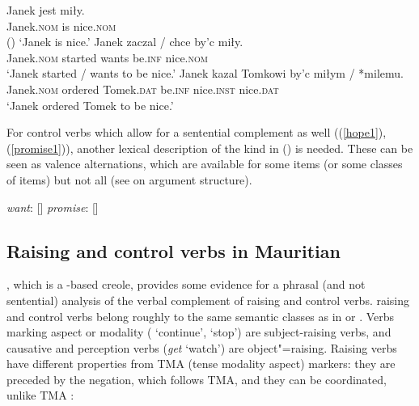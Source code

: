 \begin{exe}
\ex \begin{xlist}
\ex 
\gll Janek jest miły.\\
     Janek.\textsc{nom} is nice.\textsc{nom} \\ \hfill()
\glt `Janek is nice.'
\ex 
\gll Janek              zaczal  /  chce  by'c            miły.\\
     Janek.\textsc{nom} started {} wants be.\textsc{inf} nice.\textsc{nom} \\ 
\glt `Janek started / wants to be nice.'
\ex 
\gll Janek              kazal   Tomkowi            by'c            miłym              / *milemu.\\
     Janek.\textsc{nom} ordered Tomek.\textsc{dat} be.\textsc{inf} nice.\textsc{inst} {} \hphantom{*}nice.\textsc{dat} \\ 
\glt `Janek ordered Tomek to be nice.'
	\end{xlist}
\end{exe}


For control verbs which allow for a sentential complement as well ((\ref{hope1}), (\ref{promise1})),
another lexical description of the kind in () is needed. These can be seen as valence alternations, which are
available for some items (or some classes of items) but not all (see  on argument structure).

\eal
\ex \emph{want}: [\argst {}]
\ex \emph{promise}: [\argst {}]
\zl




\subsection{Raising and control verbs in Mauritian}\label{sec-maurit}

%
, which is a -based creole, provides some evidence for a phrasal (and not sentential) analysis of the verbal complement of raising and control verbs.
 raising and control verbs belong
roughly to the same semantic classes as in  or . Verbs marking aspect or
modality ( `continue',  `stop') are subject-raising verbs, and causative and
perception verbs (\emph{get} `watch') are object"=raising. Raising verbs have different properties from TMA (tense
modality aspect) markers: they are preceded by the negation, which follows
TMA, and they can be coordinated, unlike TMA \citep[]{HenriandLaurens2011}:

